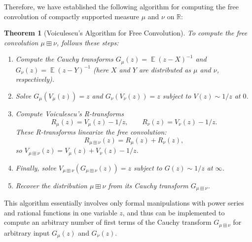 \documentclass[letterpaper,11pt,oneside,reqno]{amsart}
\numberwithin{equation}{section}
\newcounter{lecture}
\newcommand{\lect}[1]{\bigskip\addtocounter{lecture}{1}\noindent{\Large{\color{red}\bf{}Lecture \#\arabic{lecture} on #1 \hrulefill}}}
\DeclareMathOperator{\EE}{\mathbb{E}}
\newtheorem{theorem}[proposition]{Theorem}
\theoremstyle{definition}
\begin{document}
Therefore, we have established the following algorithm for computing the free convolution
of compactly supported measure $\mu$ and $\nu$ on $\mathbb{R}$:
\begin{theorem}[Voiculescu's Algorithm for Free Convolution]\label{thm:Voiculescu_algorithm}
To compute the free convolution $\mu\boxplus\nu$, follows these steps:
\begin{enumerate}
    \item Compute the Cauchy transforms $G_\mu(z)=\EE (z-X)^{-1}$ and $G_\nu(z)=\EE (z-Y)^{-1}$
    (here $X$ and $Y$ are distributed as $\mu$ and $\nu$, respectively).
    \item Solve $G_\mu(V_\mu(z))=z$ and $G_\nu(V_\nu(z))=z$ subject to $V(z)\sim 1/z$ at $0$.
    \item Compute Voiculescu's R-transforms
    \begin{equation*}
        R_\mu(z)=V_\mu(z)-1/z,\qquad R_\nu(z)=V_\nu(z)-1/z.
    \end{equation*}
    These R-transforms linearize the free convolution: 
    \begin{equation*}
    	R_{\mu\boxplus\nu}(z)=R_\mu(z)+R_\nu(z),
    \end{equation*}
    so $V_{\mu\boxplus\nu}(z)=V_\mu(z)+V_\nu(z)-1/z$.
    \item Finally, solve $V_{\mu\boxplus\nu}(G_{\mu\boxplus\nu}(z))=z$ subject to $G(z)\sim 1/z$ at $\infty$.
    \item Recover the distribution $\mu\boxplus\nu$ from its Cauchy transform $G_{\mu\boxplus\nu}$.
\end{enumerate}
\end{theorem}
This algorithm essentially involves only formal manipulations with 
power series and rational functions in one variable $z$, and 
thus can be implemented to compute an arbitrary number of first 
terms of the Cauchy transform $G_{\mu\boxplus\nu}$
for arbitrary input $G_\mu(z)$ and $G_\nu(z)$.

\lect{2/8/2016}
\end{document}
